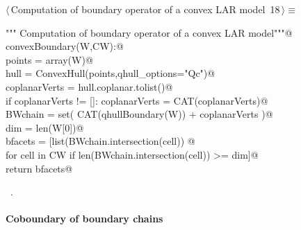 \documentclass[11pt,oneside]{article}	%
\begin{document}
\begin{flushleft} \small \label{scrap19}
\protect{}$\langle\,$Computation of boundary operator of a convex LAR model\nobreak\ {\footnotesize 18}$\,\rangle\equiv$
\vspace{-1ex}
\begin{list}{}{} \item
\mbox{}\verb@""" Computation of boundary operator of a convex LAR model"""@\\
\mbox{}\verb@def convexBoundary(W,CW):@\\
\mbox{}\verb@   points = array(W)@\\
\mbox{}\verb@   hull = ConvexHull(points,qhull_options="Qc")@\\
\mbox{}\verb@   coplanarVerts = hull.coplanar.tolist()@\\
\mbox{}\verb@   if coplanarVerts != []:  coplanarVerts = CAT(coplanarVerts)@\\
\mbox{}\verb@   BWchain = set( CAT(qhullBoundary(W)) + coplanarVerts )@\\
\mbox{}\verb@   dim = len(W[0])@\\
\mbox{}\verb@   bfacets = [list(BWchain.intersection(cell)) @\\
\mbox{}\verb@               for cell in CW if len(BWchain.intersection(cell)) >= dim]@\\
\mbox{}\verb@   return bfacets@\\
\mbox{}\verb@@{\NWsep}
\end{list}
\vspace{-1ex}
\footnotesize\addtolength{\baselineskip}{-1ex}
\begin{list}{}{\setlength{\itemsep}{-\parsep}\setlength{\itemindent}{-\leftmargin}}
\item \NWtxtMacroRefIn\ .
\end{list}
\end{flushleft}


\paragraph{Coboundary of boundary chains}
\end{document}
